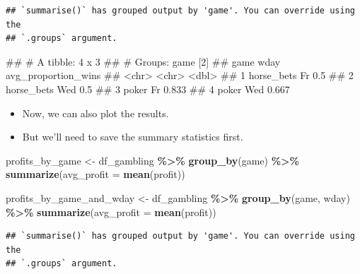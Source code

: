 \documentclass[
]{book}
\newenvironment{Shaded}{\begin{snugshade}}{\end{snugshade}}
\newcommand{\AttributeTok}[1]{\textcolor[rgb]{0.13,0.29,0.53}{#1}}
\newcommand{\FunctionTok}[1]{\textcolor[rgb]{0.13,0.29,0.53}{\textbf{#1}}}
\newcommand{\NormalTok}[1]{#1}
\newcommand{\OtherTok}[1]{\textcolor[rgb]{0.56,0.35,0.01}{#1}}
\newcommand{\SpecialCharTok}[1]{\textcolor[rgb]{0.81,0.36,0.00}{\textbf{#1}}}
\providecommand{\tightlist}{%
  \setlength{\itemsep}{0pt}\setlength{\parskip}{0pt}}
\begin{document}
\begin{verbatim}
## `summarise()` has grouped output by 'game'. You can override using the
## `.groups` argument.
\end{verbatim}

\begin{Shaded}
\begin{Highlighting}[]
\NormalTok{\#\# \# A tibble: 4 x 3}
\NormalTok{\#\# \# Groups:   game [2]}
\NormalTok{\#\#   game       wday  avg\_proportion\_wins}
\NormalTok{\#\#   \textless{}chr\textgreater{}      \textless{}chr\textgreater{}               \textless{}dbl\textgreater{}}
\NormalTok{\#\# 1 horse\_bets Fr                  0.5  }
\NormalTok{\#\# 2 horse\_bets Wed                 0.5  }
\NormalTok{\#\# 3 poker      Fr                  0.833}
\NormalTok{\#\# 4 poker      Wed                 0.667}
\end{Highlighting}
\end{Shaded}

\begin{itemize}
\tightlist
\item
  Now, we can also plot the results.
\item
  But we'll need to save the summary statistics first.
\end{itemize}

\begin{Shaded}
\begin{Highlighting}[]
\NormalTok{profits\_by\_game }\OtherTok{\textless{}{-}} 
\NormalTok{  df\_gambling }\SpecialCharTok{\%\textgreater{}\%} 
    \FunctionTok{group\_by}\NormalTok{(game) }\SpecialCharTok{\%\textgreater{}\%} 
    \FunctionTok{summarize}\NormalTok{(}\AttributeTok{avg\_profit =} \FunctionTok{mean}\NormalTok{(profit))}
\end{Highlighting}
\end{Shaded}

\begin{Shaded}
\begin{Highlighting}[]
\NormalTok{profits\_by\_game\_and\_wday }\OtherTok{\textless{}{-}} 
\NormalTok{  df\_gambling }\SpecialCharTok{\%\textgreater{}\%} 
    \FunctionTok{group\_by}\NormalTok{(game, wday) }\SpecialCharTok{\%\textgreater{}\%} 
    \FunctionTok{summarize}\NormalTok{(}\AttributeTok{avg\_profit =} \FunctionTok{mean}\NormalTok{(profit))}
\end{Highlighting}
\end{Shaded}

\begin{verbatim}
## `summarise()` has grouped output by 'game'. You can override using the
## `.groups` argument.
\end{verbatim}
\end{document}
